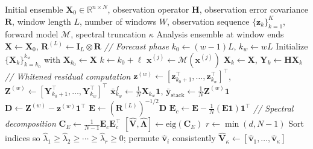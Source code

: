 \documentclass[11pt,a4paper]{article}
\begin{document}
\begin{algorithm}[H]
\caption{QPCA Ensemble Data Consistency Filter}
\label{alg:qpca_endcf}
\begin{algorithmic}[1]
\Require Initial ensemble $\mathbf{X}_0 \in \mathbb{R}^{n \times N}$, observation operator $\mathbf{H}$, observation error covariance $\mathbf{R}$, window length $L$, number of windows $W$, observation sequence $\{\mathbf{z}_k\}_{k=1}^{K}$, forward model $\mathcal{M}$, spectral truncation $\kappa$
\Ensure Analysis ensemble at window ends
\State $\mathbf{X} \gets \mathbf{X}_0$, \quad $\mathbf{R}^{(L)} \gets \mathbf{I}_L \otimes \mathbf{R}$
    \State \textit{// Forecast phase}
    \State $k_0 \gets (w-1)L$, \quad $k_w \gets wL$ 
    \State Initialize $\{\mathbf{X}_k\}_{k=k_0}^{k_w}$ with $\mathbf{X}_{k_0} \gets \mathbf{X}$
        \State $k \gets k_0 + \ell$
            \State $\mathbf{x}^{(j)} \gets \mathcal{M}(\mathbf{x}^{(j)})$
        \EndFor
        \State $\mathbf{X}_k \gets \mathbf{X}$, \quad $\mathbf{Y}_k \gets \mathbf{H}\mathbf{X}_k$
    \EndFor
    \State
    \State \textit{// Whitened residual computation}
    \State $\mathbf{z}^{(w)} \gets [\mathbf{z}_{k_0+1}^{\top}, \ldots, \mathbf{z}_{k_w}^{\top}]^{\top}$, \quad $\mathbf{Z}^{(w)} \gets [\mathbf{Y}_{k_0+1}^{\top}, \ldots, \mathbf{Y}_{k_w}^{\top}]^{\top}$
    \State $\bar{\mathbf{x}}_{k_w}^f \gets \frac{1}{N}\mathbf{X}_{k_w}\mathbf{1}$, \quad $\bar{\mathbf{y}}_{\mathrm{stack}} \gets \frac{1}{N}\mathbf{Z}^{(w)}\mathbf{1}$ 
    \State $\mathbf{D} \gets \mathbf{Z}^{(w)} - \mathbf{z}^{(w)}\mathbf{1}^{\top}$
    \State $\mathbf{E} \gets (\mathbf{R}^{(L)})^{-1/2}\mathbf{D}$ 
    \State $\mathbf{E}_c \gets \mathbf{E} - \frac{1}{N}(\mathbf{E}\mathbf{1})\mathbf{1}^{\top}$ 
    \State
	    \State \textit{// Spectral decomposition}
	    \State $\mathbf{C}_E \gets \frac{1}{N-1}\mathbf{E}_c\mathbf{E}_c^{\top}$
	    \State $[\hat{\mathbf{V}}, \hat{\boldsymbol{\Lambda}}] \gets \mathrm{eig}(\mathbf{C}_E)$ 
	    \State $r \gets \min(d, N-1)$ 
	    \State Sort indices so $\hat{\lambda}_1 \geq \hat{\lambda}_2 \geq \cdots \geq \hat{\lambda}_{r} \geq 0$; permute $\hat{\mathbf{v}}_i$ consistently
	    \State $\hat{\mathbf{V}}_{\kappa} \gets [\hat{\mathbf{v}}_1, \ldots, \hat{\mathbf{v}}_{\kappa}]$ 

\end{algorithmic}
\end{algorithm}
\end{document}
